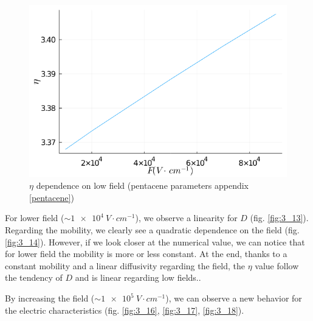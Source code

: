 \begin{figure}[!h]
    \centering
    \includegraphics*[width=.5\paperwidth]{figures/3_elec/ein_field_low.png}
    \caption{$\eta$ dependence on low field (pentacene parameters appendix \ref{pentacene})\label{fig:3_15}}
\end{figure}

For lower field ($\sim \SI{1e4}{V \cdot cm^{-1}}$), we observe a linearity for $D$ (fig. \ref{fig:3_13}). Regarding the mobility, we clearly see a quadratic dependence on the field (fig. \ref{fig:3_14}). However, if we look closer at the numerical value, we can notice that for lower field the mobility is more or less constant. At the end, thanks to a constant mobility and a linear diffusivity regarding the field, the $\eta$ value follow the tendency of $D$ and is linear regarding low fields..

By increasing the field ($\sim \SI{1e5}{V \cdot cm^{-1}}$), we can observe a new behavior for the electric characteristics (fig. \ref{fig:3_16}, \ref{fig:3_17}, \ref{fig:3_18}).

